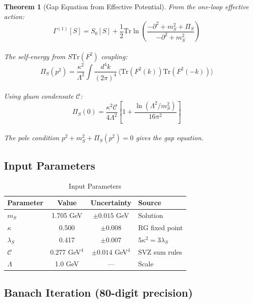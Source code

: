 \documentclass[11pt,a4paper]{article}
\renewcommand{\Tr}{\mathrm{Tr}}
\theoremstyle{plain}
\newtheorem{theorem}{Theorem}[section]
\theoremstyle{definition}
\begin{document}
\begin{theorem}[Gap Equation from Effective Potential]
From the one-loop effective action:
\begin{equation}
\Gamma^{(1)}[S] = S_0[S] + \frac{1}{2}\Tr\ln\left(\frac{-\partial^2 + m_S^2 + \Pi_S}{-\partial^2 + m_S^2}\right)
\end{equation}
\vspace{0.3em}\\
The self-energy from $S\Tr(F^2)$ coupling:
\begin{equation}
\Pi_S(p^2) = \frac{\kappa^2}{\Lambda^2}\int\frac{d^4k}{(2\pi)^4}\,
\langle\Tr(F^2(k))\Tr(F^2(-k))\rangle
\end{equation}
\vspace{0.3em}\\
Using gluon condensate $\mathcal{C}$:
\begin{equation}
\Pi_S(0) = \frac{\kappa^2\mathcal{C}}{4\Lambda^2}\left[1 + \frac{\ln(\Lambda^2/m_S^2)}{16\pi^2}\right]
\end{equation}
\vspace{0.3em}\\
The pole condition $p^2 + m_S^2 + \Pi_S(p^2) = 0$ gives the gap equation.
\end{theorem}

\subsection{Input Parameters}

\begin{table}[htbp]
\centering
\caption{Input Parameters}
\begin{tabular}{@{}lccl@{}}
\toprule
\textbf{Parameter} & \textbf{Value} & \textbf{Uncertainty} & \textbf{Source} \\
\midrule
$m_S$ & 1.705 GeV & $\pm 0.015$ GeV & Solution \\
$\kappa$ & 0.500 & $\pm 0.008$ & RG fixed point \\
$\lambda_S$ & 0.417 & $\pm 0.007$ & $5\kappa^2 = 3\lambda_S$ \\
$\mathcal{C}$ & 0.277 GeV$^4$ & $\pm 0.014$ GeV$^4$ & SVZ sum rules \\
$\Lambda$ & 1.0 GeV & --- & Scale \\
\bottomrule
\end{tabular}
\end{table}

\subsection{Banach Iteration (80-digit precision)}
\end{document}
